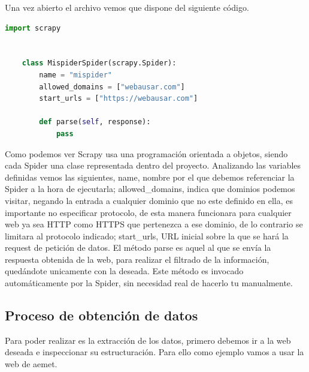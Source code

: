 Una vez abierto el archivo vemos que dispone del siguiente código.

\begin{lstlisting}[language=Python, caption={Spider recién generada}]
	import scrapy
	
	
	class MispiderSpider(scrapy.Spider):
		name = "mispider"
		allowed_domains = ["webausar.com"]
		start_urls = ["https://webausar.com"]
	
		def parse(self, response):
			pass
\end{lstlisting}

Como podemos ver Scrapy usa una programación orientada a objetos, siendo cada Spider una clase representada dentro del proyecto.\newline
\newline
Analizando las variables definidas vemos las siguientes, name, nombre por el que debemos referenciar la Spider a la hora de ejecutarla; allowed\_domains, indica que dominios podemos visitar, negando la entrada a cualquier dominio que no este definido en ella, es importante no especificar protocolo, de esta manera funcionara para cualquier web ya sea HTTP como HTTPS que pertenezca a ese dominio, de lo contrario se limitara al protocolo indicado; start\_urls, URL inicial sobre la que se hará la request de petición de datos.\newline
\newline
El método parse es aquel al que se envía la respuesta obtenida de la web, para realizar el filtrado de la información, quedándote unicamente con la deseada. Este método es invocado automáticamente por la Spider, sin necesidad real de hacerlo tu manualmente.

\subsection{Proceso de obtención de datos}
Para poder realizar es la extracción de los datos, primero debemos ir a la web deseada e inspeccionar su estructuración. Para ello como ejemplo vamos a usar la web de aemet.\newline

